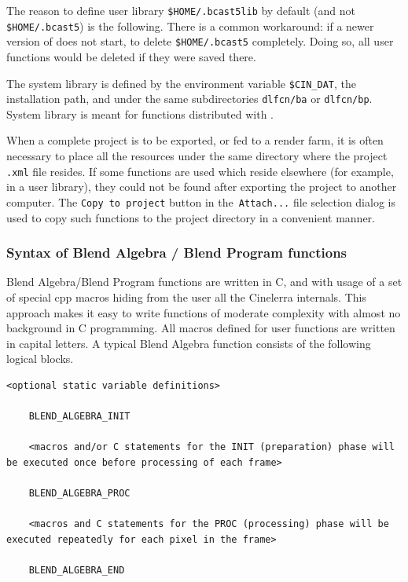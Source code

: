 The reason to define user library \texttt{\$HOME/.bcast5lib} by default (and not \texttt{\$HOME/.bcast5}) is the following. There is a common workaround: if a newer version of \CGG{} does not start, to delete \texttt{\$HOME/.bcast5} completely. Doing so, all user functions would be deleted if they were saved there.

The system library is defined by the environment variable \texttt{\$CIN\_DAT}, the \CGG{} installation path, and under the same subdirectories \texttt{dlfcn/ba} or \texttt{dlfcn/bp}. System library is meant for functions distributed with \CGG{}.

When a complete project is to be exported, or fed to a render farm, it is often necessary to place all the resources under the same directory where the project \texttt{.xml} file resides. If some functions are used which reside elsewhere (for example, in a user library), they could not be found after exporting the project to another computer. The \texttt{Copy to project} button in the\texttt{ Attach...} file selection dialog is used to copy such functions to the project directory in a convenient manner.


\subsubsection*{Syntax of Blend Algebra / Blend Program functions}
\label{ssub:syntax_blend}

Blend Algebra/Blend Program functions are written in C, and with usage of a set of special cpp macros hiding from the user all the Cinelerra internals. This approach makes it easy to write functions of moderate complexity with almost no background in C programming. All macros defined for user functions are written in capital letters. A typical Blend Algebra function consists of the following logical blocks.

\begin{lstlisting}[style=sh]
	<optional static variable definitions>
	
	BLEND_ALGEBRA_INIT
	
	<macros and/or C statements for the INIT (preparation) phase will be executed once before processing of each frame>
	
	BLEND_ALGEBRA_PROC
	
	<macros and C statements for the PROC (processing) phase will be executed repeatedly for each pixel in the frame>
	
	BLEND_ALGEBRA_END
\end{lstlisting}

